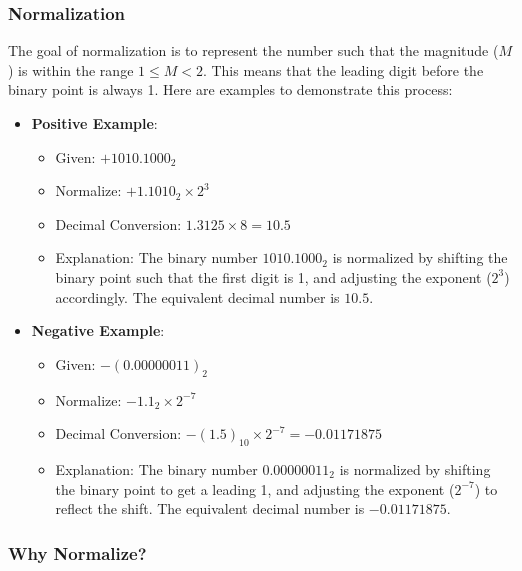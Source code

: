 \documentclass[12pt,openany]{book}
\begin{document}
			      	
			      	\subsubsection[short]{Normalization}
			      	The goal of normalization is to represent the number such that the magnitude (\(M\)) is within the range \(1 \leq M < 2\). This means that the leading digit before the binary point is always 1. Here are examples to demonstrate this process:
			      	
			      	\begin{itemize}
			      		\item[] \textbf{Positive Example}:
			      		      \begin{itemize}
			      		      	\item[] Given: \( +1010.1000_2 \)
			      		      	\item[] Normalize: \( +1.1010_2 \times 2^3 \)
			      		      	\item[] Decimal Conversion: \( 1.3125 \times 8 = 10.5 \)
			      		      	\item[] Explanation: The binary number \(1010.1000_2\) is normalized by shifting the binary point such that the first digit is 1, and adjusting the exponent (\(2^3\)) accordingly. The equivalent decimal number is \(10.5\).
			      		      \end{itemize}
			      		      \newpage
			      		\item[] \textbf{Negative Example}:
			      		      \begin{itemize}
			      		      	\item[] Given: \( -(0.00000011)_2 \)
			      		      	\item[] Normalize: \( -1.1_2 \times 2^{-7} \)
			      		      	\item[] Decimal Conversion: \( -(1.5)_{10} \times 2^{-7} = -0.01171875 \)
			      		      	\item[] Explanation: The binary number \(0.00000011_2\) is normalized by shifting the binary point to get a leading 1, and adjusting the exponent (\(2^{-7}\)) to reflect the shift. The equivalent decimal number is \(-0.01171875\).
			      		      \end{itemize}
			      	\end{itemize}
			      	    
			      	\subsubsection{Why Normalize?}
			      	    
\end{document}
